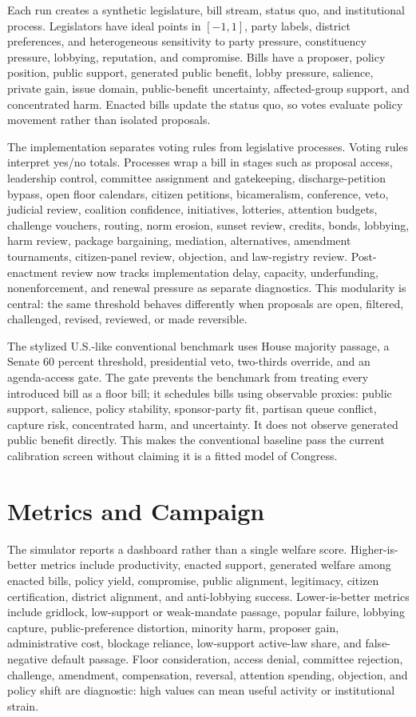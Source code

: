 \documentclass[manuscript,review,anonymous]{acmart}
\begin{document}
Each run creates a synthetic legislature, bill stream, status quo, and institutional process. Legislators have ideal points in \([-1,1]\), party labels, district preferences, and heterogeneous sensitivity to party pressure, constituency pressure, lobbying, reputation, and compromise. Bills have a proposer, policy position, public support, generated public benefit, lobby pressure, salience, private gain, issue domain, public-benefit uncertainty, affected-group support, and concentrated harm. Enacted bills update the status quo, so votes evaluate policy movement rather than isolated proposals.

The implementation separates voting rules from legislative processes. Voting rules interpret yes/no totals. Processes wrap a bill in stages such as proposal access, leadership control, committee assignment and gatekeeping, discharge-petition bypass, open floor calendars, citizen petitions, bicameralism, conference, veto, judicial review, coalition confidence, initiatives, lotteries, attention budgets, challenge vouchers, routing, norm erosion, sunset review, credits, bonds, lobbying, harm review, package bargaining, mediation, alternatives, amendment tournaments, citizen-panel review, objection, and law-registry review. Post-enactment review now tracks implementation delay, capacity, underfunding, nonenforcement, and renewal pressure as separate diagnostics. This modularity is central: the same threshold behaves differently when proposals are open, filtered, challenged, revised, reviewed, or made reversible.

The stylized U.S.-like conventional benchmark uses House majority passage, a Senate 60 percent threshold, presidential veto, two-thirds override, and an agenda-access gate. The gate prevents the benchmark from treating every introduced bill as a floor bill; it schedules bills using observable proxies: public support, salience, policy stability, sponsor-party fit, partisan queue conflict, capture risk, concentrated harm, and uncertainty. It does not observe generated public benefit directly. This makes the conventional baseline pass the current calibration screen without claiming it is a fitted model of Congress.

\section{Metrics and Campaign}

The simulator reports a dashboard rather than a single welfare score. Higher-is-better metrics include productivity, enacted support, generated welfare among enacted bills, policy yield, compromise, public alignment, legitimacy, citizen certification, district alignment, and anti-lobbying success. Lower-is-better metrics include gridlock, low-support or weak-mandate passage, popular failure, lobbying capture, public-preference distortion, minority harm, proposer gain, administrative cost, blockage reliance, low-support active-law share, and false-negative default passage. Floor consideration, access denial, committee rejection, challenge, amendment, compensation, reversal, attention spending, objection, and policy shift are diagnostic: high values can mean useful activity or institutional strain.
\end{document}
